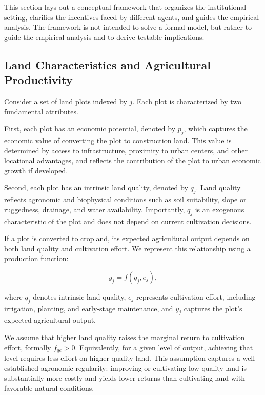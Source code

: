This section lays out a conceptual framework that organizes the institutional setting, clarifies the incentives faced by different agents, and guides the empirical analysis. 
The framework is not intended to solve a formal model, but rather to guide the empirical analysis and to derive testable implications.

\subsection{Land Characteristics and Agricultural Productivity}

Consider a set of land plots indexed by $j$. Each plot is characterized by two fundamental attributes.

First, each plot has an economic potential, denoted by $p_j$, which captures the economic value of converting the plot to construction land. 
This value is determined by access to infrastructure, proximity to urban centers, and other locational advantages, and reflects the contribution of the plot to urban economic growth if developed.

Second, each plot has an intrinsic land quality, denoted by $q_j$. 
Land quality reflects agronomic and biophysical conditions such as soil suitability, slope or ruggedness, drainage, and water availability. 
Importantly, $q_j$ is an exogenous characteristic of the plot and does not depend on current cultivation decisions.

If a plot is converted to cropland, its expected agricultural output depends on both land quality and cultivation effort.
We represent this relationship using a production function:

\begin{equation}
y_j = f(q_j, e_j),
\end{equation}

where $q_j$ denotes intrinsic land quality, $e_j$ represents cultivation effort, including irrigation, planting, and early-stage maintenance, and $y_j$ captures the plot's expected agricultural output.

We assume that higher land quality raises the marginal return to cultivation effort, formally $f_{qe} > 0$. 
Equivalently, for a given level of output, achieving that level requires less effort on higher-quality land. 
This assumption captures a well-established agronomic regularity: improving or cultivating low-quality land is substantially more costly and yields lower returns than cultivating land with favorable natural conditions.

